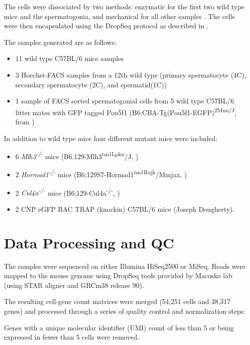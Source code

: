 The cells were dissociated by two methods: enzymatic for the first two wild type mice and the spermatogonia, and mechanical for all other samples \parencite{Lima2017Standardized,Jung2019Unified}. The cells were then encapsulated using the DropSeq protocol \parencite{Macosko2015Highly} as described in \cite{Jung2019Unified}. 

The samples generated are as follows:

\begin{itemize}
	\item 11 wild type C57BL/6 mice samples
	\item 3 Hoechst-FACS samples from a 12th wild type (primary spermatocyte (4C), secondary spermatocyte (2C), and spermatid(1C))
	\item 1 sample of FACS sorted spermatogonial cells from 5 wild type C57BL/6 litter mates with GFP tagged Pou5f1 (B6;CBA-Tg(Pou5f1-EGFP)\textsuperscript{2Mnn/J}, from \cite{Szabo2002Allelespecific})
\end{itemize}

In addition to wild type mice four different mutant mice were included:
\begin{itemize}
	\item 6 \textit{Mlh3\textsuperscript{-/-}} mice (B6.129-Mlh3\textsuperscript{tm1Lpkn}/J, \cite{Lipkin2002Meiotic})
	\item 2 \textit{Hormad1\textsuperscript{-/-}} mice (B6;129S7-Hormad1\textsuperscript{tm1Rajk}/Mmjax, \cite{Shin2010Hormad1})
	\item 2 \textit{Cul4a\textsuperscript{-/-}} mice (B6;129-Cul4a\textsuperscript{-/-}, \cite{Yin2011E3})
	\item 2 CNP eGFP BAC TRAP (knockin) C57BL/6 mice (Joseph Dougherty).
\end{itemize}


\section{Data Processing and QC}

The samples were sequenced on either Illumina HiSeq2500 or MiSeq. Reads were mapped to the mouse genome using DropSeq tools provided by Macosko lab (using STAR aligner and GRCm38 release 90).

The resulting cell-gene count matrices were merged (54,251 cells and 38,317 genes) and processed through a series of quality control and normalization steps:

Genes with a unique molecular identifier (UMI) count of less than 5 or being expressed in fewer than 5 cells were removed.

